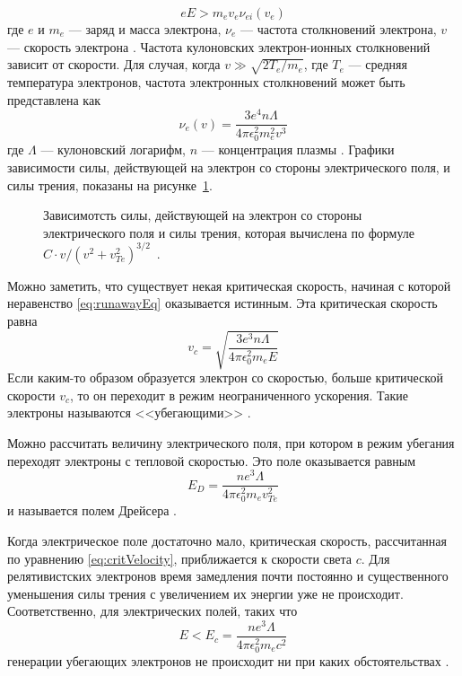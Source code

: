 \begin{equation}
  \label{eq:runawayEq}
  e E >  m_e v_e \nu_{ei}(v_e)
\end{equation}
где $e$ и $m_e$ --- заряд и масса электрона, $\nu_{e}$ --- частота столкновений электрона, $v$ --- скорость электрона \cite{Wesson2004}. Частота кулоновских электрон-ионных столкновений зависит от скорости. Для случая, когда $v \gg \sqrt{ 2 T_e / m_e }$, где $T_e$ --- средняя температура электронов, частота электронных столкновений может быть представлена как 
\begin{equation*}
  \nu_{e}(v) = \frac{ 3 e^4 n \Lambda }{ 4 \pi \epsilon_0^2 m_e^2 v^3 }
\end{equation*} 
где $\Lambda$ --- кулоновский логарифм, $n$ --- концентрация плазмы \cite{Wesson2004}. Графики зависимости силы, действующей на электрон со стороны электрического поля, и силы трения, показаны на рисунке~\ref{fig:runawayForces}.

\begin{figure}[ht]
  \caption{ Зависимотсть силы, действующей на электрон со стороны электрического поля и силы трения, которая вычислена по формуле $ C \cdot v/( v^2 + v_{Te}^2 )^{3/2} $~\cite{Golant1977}.}
  \label{fig:runawayForces}
\end{figure}

Можно заметить, что существует некая критическая скорость, начиная с которой неравенство \ref{eq:runawayEq} оказывается истинным. Эта критическая скорость равна
\begin{equation}
  \label{eq:critVelocity}
  v_c = \sqrt{ \frac{ 3 e^3 n \Lambda }{ 4 \pi \epsilon_0^2 m_e E } }
\end{equation}
Если каким-то образом образуется электрон со скоростью, больше критической скорости $v_c$, то он переходит в режим неограниченного ускорения. Такие электроны называются <<убегающими>> \cite{Golant1977}.

Можно рассчитать величину электрического поля, при котором в режим убегания переходят электроны с тепловой скоростью. Это поле оказывается равным 
\begin{equation*}
  E_D = \frac{ n e^3 \Lambda }{ 4 \pi \epsilon_0^2 m_e v_{Te}^2 }
\end{equation*}
и называется полем Дрейсера \cite{Dreicer1959,Golant1977,Wesson2004}. 

Когда электрическое поле достаточно мало, критическая скорость, рассчитанная по уравнению \ref{eq:critVelocity}, приближается к скорости света $c$. Для релятивистских электронов время замедления почти постоянно и существенного уменьшения силы трения с увеличением их энергии уже не происходит. Соответственно, для электрических полей, таких что
\begin{equation*}
  E < E_c = \frac{ n e^3 \Lambda }{ 4 \pi \epsilon_0^2 m_e c^2 }
\end{equation*}
генерации убегающих электронов не происходит ни при каких обстоятельствах \cite{Wesson2004}.

